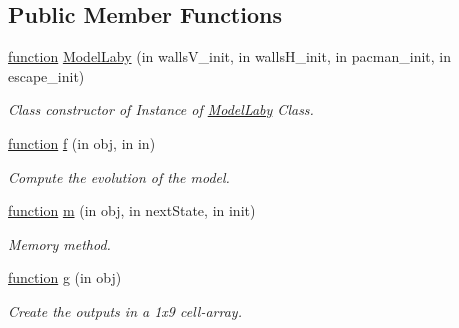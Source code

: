 \subsection*{Public Member Functions}
\begin{DoxyCompactItemize}
\item 
\hyperlink{_plan__desuma_functions_8m_ac2ffb26d6f42d3bbcd7847b0873403f4}{function} \hyperlink{class_model_laby_adefbf2299bfb17336cae5508d54443a8}{Model\+Laby} (in walls\+V\+\_\+init, in walls\+H\+\_\+init, in pacman\+\_\+init, in escape\+\_\+init)
\begin{DoxyCompactList}\small\item\em Class constructor of Instance of \hyperlink{class_model_laby}{Model\+Laby} Class. \end{DoxyCompactList}\item 
\hyperlink{_plan__desuma_functions_8m_ac2ffb26d6f42d3bbcd7847b0873403f4}{function} \hyperlink{class_model_laby_a6f3b146c92a207e95690d08975e1e072}{f} (in obj, in in)
\begin{DoxyCompactList}\small\item\em Compute the evolution of the model. \end{DoxyCompactList}\item 
\hyperlink{_plan__desuma_functions_8m_ac2ffb26d6f42d3bbcd7847b0873403f4}{function} \hyperlink{class_model_laby_a3140f24c6c4b80037b7d4f521c6ae2d3}{m} (in obj, in next\+State, in init)
\begin{DoxyCompactList}\small\item\em Memory method. \end{DoxyCompactList}\item 
\hyperlink{_plan__desuma_functions_8m_ac2ffb26d6f42d3bbcd7847b0873403f4}{function} \hyperlink{class_model_laby_a07dadfabe92bf9a144b8a862720e7746}{g} (in obj)
\begin{DoxyCompactList}\small\item\em Create the outputs in a 1x9 cell-\/array. \end{DoxyCompactList}\end{DoxyCompactItemize}
